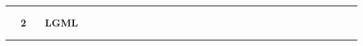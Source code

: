 \documentclass[11pt, compress, t, notes = noshow, xcolor = table, 
aspectratio = 1610]{beamer}
\newcommand{\highlight}[1]{\textcolor{highlightcol}{\textbf{#1}}}
\newcommand{\flexitem}[1]{\item[$\highlight{#1}$]}
\begin{document}

% 
% 


\LARGE
\begin{frame}{\phantom{foo}}
\normalsize
\vspace{-0.5cm}
\noindent \textcolor{gray!90}{\rule{\textwidth}{1pt}}
\smallskip

\Huge
\hspace{0pt}
\vfill
\textbf{\highlight{~~ 2 ~~ LGML}}
\vfill
\hspace{0pt}

\noindent \textcolor{gray!90}{\rule{\textwidth}{1pt}}

\end{frame}

\end{document}
